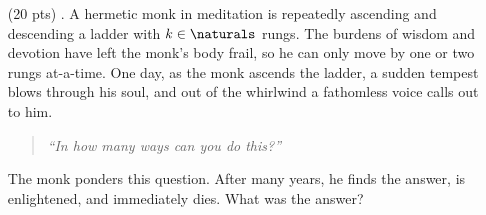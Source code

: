 \begin{enumerate}
  \item[(20 pts) \quad 5.]
    A hermetic monk in meditation is repeatedly ascending and descending a ladder with $k \in \naturals$ rungs.
    The burdens of wisdom and devotion have left the monk's body frail, so he can only move by one or two rungs at-a-time.
    One day, as the monk ascends the ladder, a sudden tempest blows through his soul, and out of the whirlwind a fathomless voice calls out to him.
    \begin{quote}
      \emph{``In how many ways can you do this?''}
    \end{quote}
    The monk ponders this question.
    After many years, he finds the answer, is enlightened, and immediately dies.
    What was the answer?

\end{enumerate}


